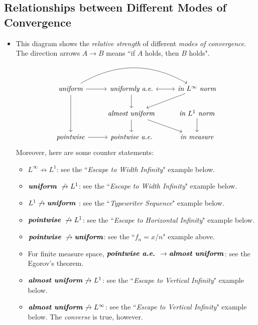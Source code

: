 \documentclass[11pt]{article}
\begin{document}
\subsection{Relationships between Different Modes of Convergence}
\begin{itemize}
\item \begin{remark} This diagram shows the \emph{relative strength} of different \emph{modes of convergence}. The direction arrows $A \rightarrow B$ means ``if $A$ holds, then $B$ holds".
\[
  \begin{tikzcd}
     \text{\emph{uniform}} \arrow{dd}{}  \arrow{r}{}  \arrow[rr, swap, bend left] & \text{\emph{uniformly a.e.}}  \arrow{d}{} & \arrow[l, leftrightarrow] \text{\emph{in $L^{\infty}$ norm}} \arrow{dl}{} \\
      & \text{\emph{almost uniform}}  \arrow{d}{} \arrow{dr}{} &  \text{\emph{in $L^{1}$ norm}} \arrow{d}{} \\
    \text{\emph{pointwise}}  \arrow{r}{} &   \text{\emph{pointwise a.e}.} & \text{\emph{in measure}}
  \end{tikzcd}
\] 
Moreover, here are some counter statements:
\begin{itemize}
\item $L^{\infty} \not\rightarrow L^{1}$: see the ``\emph{Escape to Width Infinity}" example below.
\item $\text{\emph{\textbf{uniform}} } \not\rightarrow L^{1}$: see the ``\emph{Escape to Width Infinity}" example below.
\item $L^{1}  \not\rightarrow \text{\emph{\textbf{uniform}} }$: see the ``\emph{Typewriter Sequence}" example below.
\item $\text{\emph{\textbf{pointwise}} } \not\rightarrow L^{1}$: see the ``\emph{Escape to Horizontal Infinity}" example below.
\item $\text{\emph{\textbf{pointwise}} } \not\rightarrow \text{\emph{\textbf{uniform}}}$: see the ``$f_n = x/n$" example above.
\item For finite measure space, $\text{\emph{\textbf{pointwise a.e.}} } \rightarrow \text{\emph{\textbf{almost uniform}}}$: see the Egorov's theorem.
\item $\text{\emph{\textbf{almost uniform}}}  \not\rightarrow L^{1}$: see the ``\emph{Escape to Vertical Infinity}" example below.
\item $\text{\emph{\textbf{almost uniform}}}  \not\rightarrow L^{\infty}$: see the ``\emph{Escape to Vertical Infinity}" example below. The \emph{converse} is true, however.

\end{itemize}
\end{remark}
\end{itemize}
\end{document}
